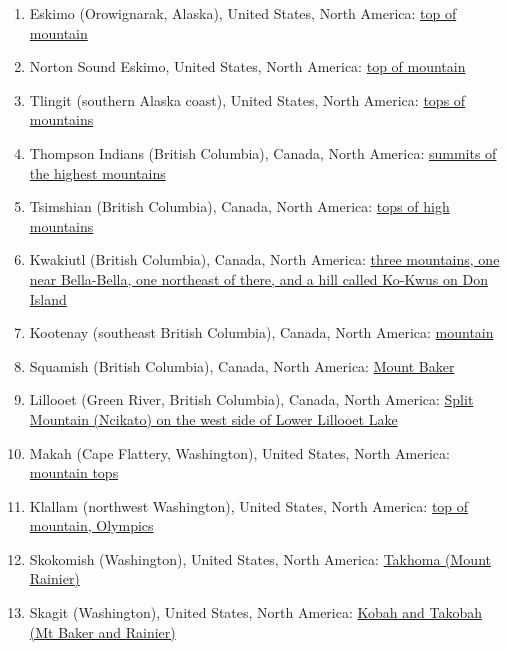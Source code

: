 \documentclass[10pt,twocolumn,letterpaper]{article}
\begin{document}
\begin{flushleft}
\begin{enumerate}
\item Eskimo (Orowignarak, Alaska), United States, North America: \href{http://www.talkorigins.org/faqs/flood-myths.html#Orowignarak}{top of mountain}
\item Norton Sound Eskimo, United States, North America: \href{http://www.talkorigins.org/faqs/flood-myths.html#NortonSound}{top of mountain}
\item Tlingit (southern Alaska coast), United States, North America: \href{http://www.talkorigins.org/faqs/flood-myths.html#Tlingit}{tops of mountains}
\item Thompson Indians (British Columbia), Canada, North America: \href{http://www.talkorigins.org/faqs/flood-myths.html#Thompson}{summits of the highest mountains}
\item Tsimshian (British Columbia), Canada, North America: \href{http://www.talkorigins.org/faqs/flood-myths.html#Tsimshian}{tops of high mountains}
\item Kwakiutl (British Columbia), Canada, North America: \href{http://www.talkorigins.org/faqs/flood-myths.html#Kwakiutl}{three mountains, one near Bella-Bella, one northeast of there, and a hill called Ko-Kwus on Don Island}
\item Kootenay (southeast British Columbia), Canada, North America: \href{http://www.talkorigins.org/faqs/flood-myths.html#Kootenay}{mountain}
\item Squamish (British Columbia), Canada, North America: \href{http://www.talkorigins.org/faqs/flood-myths.html#Squamish}{Mount Baker}
\item Lillooet (Green River, British Columbia), Canada, North America: \href{http://www.talkorigins.org/faqs/flood-myths.html#Lillooet}{Split Mountain (Ncikato) on the west side of Lower Lillooet Lake}
\item Makah (Cape Flattery, Washington), United States, North America: \href{http://www.talkorigins.org/faqs/flood-myths.html#Makah}{mountain tops}
\item Klallam (northwest Washington), United States, North America: \href{http://www.talkorigins.org/faqs/flood-myths.html#Klallam}{top of mountain, Olympics}
\item Skokomish (Washington), United States, North America: \href{http://www.talkorigins.org/faqs/flood-myths.html#Skokomish}{Takhoma (Mount Rainier)}
\item Skagit (Washington), United States, North America: \href{http://www.talkorigins.org/faqs/flood-myths.html#Skagit}{Kobah and Takobah (Mt Baker and Rainier)}

\end{enumerate}
\end{flushleft}
\end{document}
